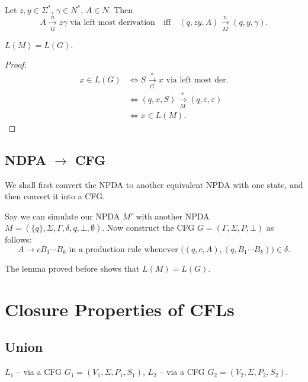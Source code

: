 \begin{blackbox}
\begin{lemma}
Let $z, y \in \Sigma^*$, $\gamma \in N^*$, $A \in N$. Then
\[
A \xrightarrow[G]{n} z\gamma \text{ via left most derivation} \quad \text{iff} \quad (q, zy, A) \xrightarrow[M]{n} (q, y, \gamma).
\]
\end{lemma}
\end{blackbox}

\begin{blackbox}
\begin{theorem}
$L(M) = L(G)$.
\end{theorem}
\end{blackbox}

\begin{proof}
\begin{align*}
x \in L(G) &\iff S \xrightarrow[G]{*} x \text{ via left most der.} \\
&\iff (q, x, S) \xrightarrow[M]{*} (q, \varepsilon, \varepsilon) \\
&\iff x \in L(M).
\end{align*}
\end{proof}

\subsection*{NDPA $\to$ CFG}

We shall first convert the NPDA to another equivalent NPDA with one state, and then convert it into a CFG.

Say we can simulate our NPDA $M'$ with another NPDA $M = (\{q\}, \Sigma, \Gamma, \delta, q, \bot, \emptyset)$. Now construct the CFG $G = (\Gamma, \Sigma, P, \bot)$ as follows:
\[
A \to cB_1 \cdots B_k \text{ in a production rule whenever } \big((q,c,A),(q,B_1\cdots B_k)\big) \in \delta.
\]

The lemma proved before shows that $L(M) = L(G)$.

\section{Closure Properties of CFLs}

\subsection*{Union}

$L_1$ -- via a CFG $G_1 = (V_1, \Sigma, P_1, S_1)$, $L_2$ -- via a CFG $G_2 = (V_2, \Sigma, P_2, S_2)$.

